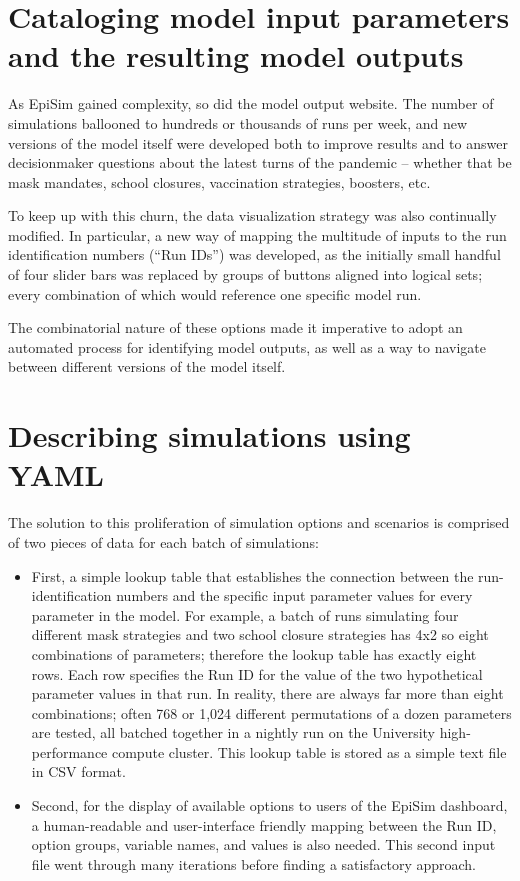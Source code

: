 \hypertarget{covid-cataloging-model-input-parameters-and-the-resulting-model-outputs}{%
\section{Cataloging model input parameters and the resulting model outputs}\label{cataloging-model-input-parameters-and-the-resulting-model-outputs}}

As EpiSim gained complexity, so did the model output website. The number of simulations ballooned to hundreds or thousands of runs per week, and new versions of the model itself were developed both to improve results and to answer decisionmaker questions about the latest turns of the pandemic -- whether that be mask mandates, school closures, vaccination strategies, boosters, etc.

To keep up with this churn, the data visualization strategy was also continually modified. In particular, a new way of mapping the multitude of inputs to the run identification numbers (``Run IDs'') was developed, as the initially small handful of four slider bars was replaced by groups of buttons aligned into logical sets; every combination of which would reference one specific model run.

The combinatorial nature of these options made it imperative to adopt an automated process for identifying model outputs, as well as a way to navigate between different versions of the model itself.

\hypertarget{covid-describing-simulations-using-yaml}{%
\section{Describing simulations using YAML}\label{covid-describing-simulations-using-yaml}}

The solution to this proliferation of simulation options and scenarios is comprised of two pieces of data for each batch of simulations:

\begin{itemize}
  \tightlist
  \item
  First, a simple lookup table that establishes the connection between the run-identification numbers and the specific input parameter values for every parameter in the model. For example, a batch of runs simulating four different mask strategies and two school closure strategies has 4x2 so eight combinations of parameters; therefore the lookup table has exactly eight rows. Each row specifies the Run ID for the value of the two hypothetical parameter values in that run. In reality, there are always far more than eight combinations; often 768 or 1,024 different permutations of a dozen parameters are tested, all batched together in a nightly run on the University high-performance compute cluster. This lookup table is stored as a simple text file in CSV format.
  \item
  Second, for the display of available options to users of the EpiSim dashboard, a human-readable and user-interface friendly mapping between the Run ID, option groups, variable names, and values is also needed. This second input file went through many iterations before finding a satisfactory approach.
\end{itemize}


